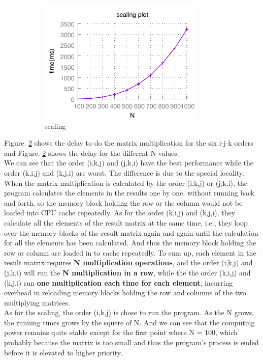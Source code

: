\documentclass{article}
\begin{document}
\begin{figure}[h!]
\begin{subfigure}[b]{0.3\linewidth}
          \includegraphics[width=\linewidth]{matrix_scaling.pdf}
          \caption{scaling}
          \label{fig:scaling}
        \end{subfigure}
        \caption{\label{fig:part1}}
    \end{figure}

\indent Figure. \ref{fig:part1}  shows the delay to do the  matrix multiplication for the six i-j-k orders and Figure. \ref{fig:part1}  shows the delay for the different N values. \\
\indent We can see that the order (i,k,j) and (j,k,i) have the best performance while the order (k,i,j) and (k,j,i) are worst. The difference is due to the special locality. When the matrix multiplication is calculated by the order (i,k,j) or (j,k,i), the program calculates the elements in the results one by one, without running back and forth, so the memory block holding the row or the column would not be loaded into CPU cache repeatedly. As for the order (k,i,j) and (k,j,i), they calculate all the elements of the result matrix at the same time, i.e., they loop over the memory blocks of the result matrix again and again until the calculation for all the elements has been calculated. And thus the memory block holding the row or column are loaded in to cache repeatedly. To sum up, each element in the result matrix requires \textbf{N multiplication operations}, and the order (i,k,j) and (j,k,i) will run the \textbf{N multiplication in a row}, while the the order (k,i,j) and (k,j,i) run \textbf{one multiplication each time for each element}, incurring overhead in reloading memory blocks holding the row and columns of the two multiplying matrices.\\
\indent As for the scaling, the order (i,k,j) is chose to run the program. As the N grows, the running times grows by the squere of N. And we can see that the computing power remains quite stable except for the first point where N = 100, which probably because the matrix is too small and thus the program's process is ended before it is elevated to higher priority.
\end{document}
